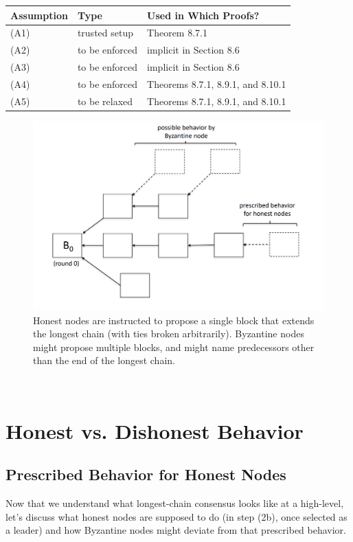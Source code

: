 \begin{center}
\begin{tabular}{ | m{2.5cm} | m{2.5cm}| m{4cm} | } 
  \hline
  Assumption & Type & Used in Which Proofs? \\ 
  \hline
  (A1) & trusted setup & Theorem 8.7.1 \\ 
  \hline
  (A2) & to be enforced  & implicit in Section 8.6 \\ 
  \hline
  (A3) & to be enforced  & implicit in Section 8.6 \\ 
  \hline
  (A4) & to be enforced  & Theorems 8.7.1, 8.9.1, and 8.10.1 \\ 
  \hline
  (A5) & to be relaxed & Theorems 8.7.1, 8.9.1, and 8.10.1 \\ 
  \hline
\end{tabular}
\end{center}

\begin{figure}[h]
    \centering
    \includegraphics[scale = 0.5]{figures/f24.png}
    \caption{Honest nodes are instructed to propose a single block that extends the longest
chain (with ties broken arbitrarily). Byzantine nodes might propose multiple blocks, and
might name predecessors other than the end of the longest chain.
}
    \label{fig:mesh1}
\end{figure}\\

\section{Honest vs. Dishonest Behavior}
\subsection{Prescribed Behavior for Honest Nodes}
Now that we understand what longest-chain consensus looks like at a high-level, let’s discuss
what honest nodes are supposed to do (in step (2b), once selected as a leader) and how
Byzantine nodes might deviate from that prescribed behavior.\\

